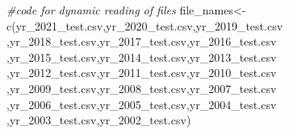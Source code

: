 \documentclass[
]{article}
\newenvironment{Shaded}{\begin{snugshade}}{\end{snugshade}}
\newcommand{\CommentTok}[1]{\textcolor[rgb]{0.56,0.35,0.01}{\textit{#1}}}
\newcommand{\FunctionTok}[1]{\textcolor[rgb]{0.00,0.00,0.00}{#1}}
\newcommand{\NormalTok}[1]{#1}
\newcommand{\OtherTok}[1]{\textcolor[rgb]{0.56,0.35,0.01}{#1}}
\newcommand{\StringTok}[1]{\textcolor[rgb]{0.31,0.60,0.02}{#1}}
\begin{document}
\begin{Shaded}
\begin{Highlighting}[]
\CommentTok{\#code for dynamic reading of files}
\NormalTok{file\_names}\OtherTok{\textless{}{-}}\FunctionTok{c}\NormalTok{(}\StringTok{\textquotesingle{}yr\_2021\_test.csv\textquotesingle{}}\NormalTok{,}\StringTok{\textquotesingle{}yr\_2020\_test.csv\textquotesingle{}}\NormalTok{,}\StringTok{\textquotesingle{}yr\_2019\_test.csv\textquotesingle{}}
\NormalTok{              ,}\StringTok{\textquotesingle{}yr\_2018\_test.csv\textquotesingle{}}\NormalTok{,}\StringTok{\textquotesingle{}yr\_2017\_test.csv\textquotesingle{}}\NormalTok{,}\StringTok{\textquotesingle{}yr\_2016\_test.csv\textquotesingle{}}
\NormalTok{              ,}\StringTok{\textquotesingle{}yr\_2015\_test.csv\textquotesingle{}}\NormalTok{,}\StringTok{\textquotesingle{}yr\_2014\_test.csv\textquotesingle{}}\NormalTok{,}\StringTok{\textquotesingle{}yr\_2013\_test.csv\textquotesingle{}}
\NormalTok{              ,}\StringTok{\textquotesingle{}yr\_2012\_test.csv\textquotesingle{}}\NormalTok{,}\StringTok{\textquotesingle{}yr\_2011\_test.csv\textquotesingle{}}\NormalTok{,}\StringTok{\textquotesingle{}yr\_2010\_test.csv\textquotesingle{}}
\NormalTok{              ,}\StringTok{\textquotesingle{}yr\_2009\_test.csv\textquotesingle{}}\NormalTok{,}\StringTok{\textquotesingle{}yr\_2008\_test.csv\textquotesingle{}}\NormalTok{,}\StringTok{\textquotesingle{}yr\_2007\_test.csv\textquotesingle{}}
\NormalTok{              ,}\StringTok{\textquotesingle{}yr\_2006\_test.csv\textquotesingle{}}\NormalTok{,}\StringTok{\textquotesingle{}yr\_2005\_test.csv\textquotesingle{}}\NormalTok{,}\StringTok{\textquotesingle{}yr\_2004\_test.csv\textquotesingle{}}
\NormalTok{              ,}\StringTok{\textquotesingle{}yr\_2003\_test.csv\textquotesingle{}}\NormalTok{,}\StringTok{\textquotesingle{}yr\_2002\_test.csv\textquotesingle{}}\NormalTok{)}
\end{Highlighting}
\end{Shaded}
\end{document}
